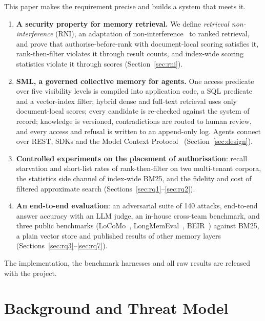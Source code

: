 \documentclass[11pt,a4paper]{article}
\theoremstyle{remark}
\newcommand{\sys}{SML}
\begin{document}
This paper makes the requirement precise and builds a system that meets it.
\begin{enumerate}[leftmargin=*]
  \item \textbf{A security property for memory retrieval.} We define \emph{retrieval non-interference} (RNI),
  an adaptation of non-interference~\cite{goguen1982noninterference} to ranked retrieval, and prove that
  authorise-before-rank with document-local scoring satisfies it, rank-then-filter violates it through result
  counts, and index-wide scoring statistics violate it through scores (Section~\ref{sec:rni}).
  \item \textbf{\sys{}, a governed collective memory for agents.} One access predicate over five visibility
  levels is compiled into application code, a SQL predicate and a vector-index filter; hybrid dense and
  full-text retrieval uses only document-local scores; every candidate is re-checked against the system of
  record; knowledge is versioned, contradictions are routed to human review, and every access and refusal is
  written to an append-only log. Agents connect over REST, SDKs and the Model Context
  Protocol~\cite{anthropic2024mcp} (Section~\ref{sec:design}).
  \item \textbf{Controlled experiments on the placement of authorisation}: recall starvation and short-list
  rates of rank-then-filter on two multi-tenant corpora, the statistics side channel of index-wide BM25, and
  the fidelity and cost of filtered approximate search (Sections~\ref{sec:rq1}--\ref{sec:rq2}).
  \item \textbf{An end-to-end evaluation}: an adversarial suite of 140 attacks, end-to-end answer accuracy with an
  LLM judge, an in-house cross-team
  benchmark, and three public benchmarks (LoCoMo~\cite{maharana2024locomo}, LongMemEval~\cite{wu2025longmemeval},
  BEIR~\cite{thakur2021beir}) against BM25, a plain vector store and published results of other memory layers
  (Sections~\ref{sec:rq3}--\ref{sec:rq7}).
\end{enumerate}
The implementation, the benchmark harnesses and all raw results are released with the project.

\section{Background and Threat Model}
\label{sec:background}
\end{document}
